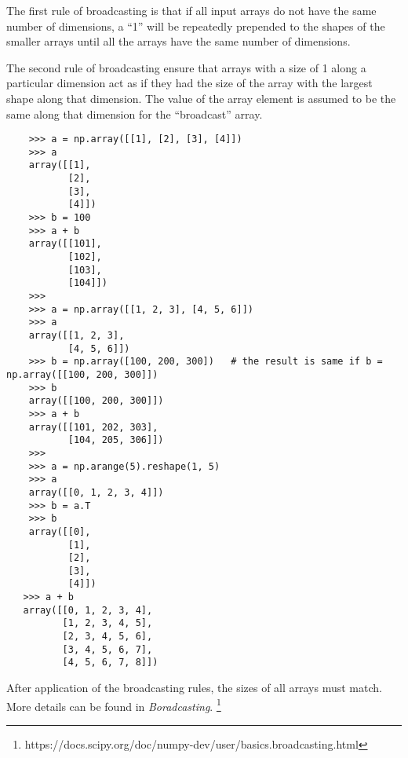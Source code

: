 \documentclass[UTF8]{article}
\begin{document}
The first rule of broadcasting is that if all input arrays do not have the same number of
dimensions, a ``1'' will be repeatedly prepended to the shapes of the smaller arrays until all the
arrays have the same number of dimensions.

The second rule of broadcasting ensure that arrays with a size of 1 along a particular dimension
act as if they had the size of the array with the largest shape along that dimension. The value of
the array element is assumed to be the same along that dimension for the ``broadcast'' array.

\begin{verbatim}
    >>> a = np.array([[1], [2], [3], [4]])
    >>> a
    array([[1],
           [2],
           [3],
           [4]])
    >>> b = 100
    >>> a + b
    array([[101],
           [102],
           [103],
           [104]])
    >>>
    >>> a = np.array([[1, 2, 3], [4, 5, 6]])
    >>> a
    array([[1, 2, 3],
           [4, 5, 6]])
    >>> b = np.array([100, 200, 300])   # the result is same if b = np.array([[100, 200, 300]])
    >>> b
    array([[100, 200, 300]])
    >>> a + b
    array([[101, 202, 303],
           [104, 205, 306]])
    >>>
    >>> a = np.arange(5).reshape(1, 5)
    >>> a
    array([[0, 1, 2, 3, 4]])
    >>> b = a.T
    >>> b
    array([[0],
           [1],
           [2],
           [3],
           [4]])
   >>> a + b
   array([[0, 1, 2, 3, 4],
          [1, 2, 3, 4, 5],
          [2, 3, 4, 5, 6],
          [3, 4, 5, 6, 7],
          [4, 5, 6, 7, 8]])
\end{verbatim}

After application of the broadcasting rules, the sizes of all arrays must match. More details can
be found in \emph{Boradcasting}.
\footnote{https://docs.scipy.org/doc/numpy-dev/user/basics.broadcasting.html}
\end{document}
